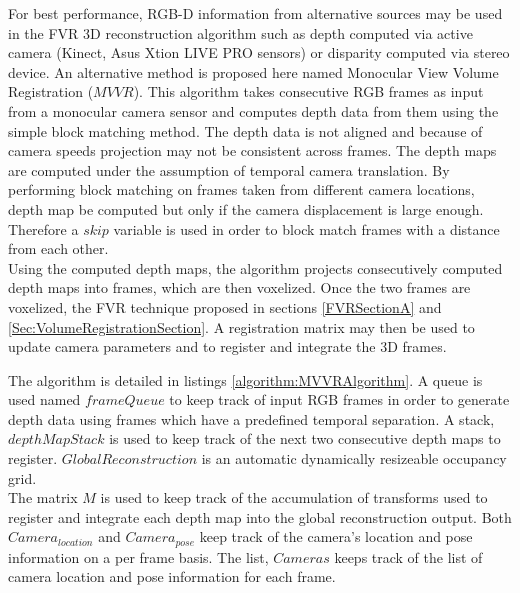 For best performance, RGB-D information from alternative sources may be used in the FVR 3D reconstruction algorithm such as depth computed via active camera (Kinect, Asus Xtion LIVE PRO sensors) or disparity computed via stereo device. An alternative method is proposed here named Monocular View Volume Registration ($MVVR$). This algorithm takes consecutive RGB frames as input from a monocular camera sensor and computes depth data from them using the simple block matching method. The depth data is not aligned and because of camera speeds projection may not be consistent across frames. The depth maps are computed under the assumption of temporal camera translation. By performing block matching on frames taken from different camera locations, depth map be computed but only if the camera displacement is large enough. Therefore a $skip$ variable is used in order to block match frames with a distance from each other. \\

Using the computed depth maps, the algorithm projects consecutively computed depth maps into frames, which are then voxelized. Once the two frames are voxelized, the FVR technique proposed in sections \ref{FVRSectionA} and \ref{Sec:VolumeRegistrationSection}. A registration matrix may then be used to update camera parameters and to register and integrate the 3D frames. 

The algorithm is detailed in listings \ref{algorithm:MVVRAlgorithm}. A queue is used named $frameQueue$ to keep track of input RGB frames in order to generate depth data using frames which have a predefined temporal separation. A stack, $depthMapStack$ is used to keep track of the next two consecutive depth maps to register. $GlobalReconstruction$ is an automatic dynamically resizeable occupancy grid. \\

The matrix $M$ is used to keep track of the accumulation of transforms used to register and integrate each depth map into the global reconstruction output. Both $Camera_{location}$ and $Camera_{pose}$ keep track of the camera's location and pose information on a per frame basis. The list, $Cameras$ keeps track of the list of camera location and pose information for each frame.\\


